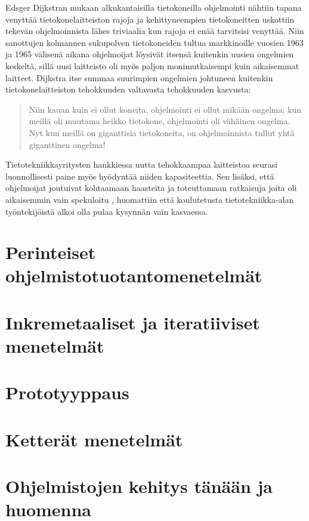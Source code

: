 \documentclass[finnish,12pt]{tktltiki2}
\theoremstyle{definition}
\theoremstyle{remark}
\begin{document}
Edsger Dijkstran mukaan alkukantaisilla tietokoneilla ohjelmointi nähtiin tapana venyttää tietokonelaitteiston rajoja ja kehittyneempien tietokoneitten uskottiin tekevän ohjelmoinnista lähes triviaalia kun rajoja ei enää tarvitsisi venyttää. \cite{Dijkstra:1979:HP:1241515.1241525} Niin sanottujen kolmannen sukupolven tietokoneiden tultua markkinoille vuosien 1963 ja 1965 välisenä aikana ohjelmoijat löysivät itsensä kuitenkin uusien ongelmien keskeltä, sillä uusi laitteisto oli myös paljon monimutkaisempi kuin aikaisemmat laitteet. Dijkstra itse summaa suurimpien ongelmien johtuneen kuitenkin tietokonelaitteiston tehokkuuden valtavasta tehokkuuden kasvusta: \begin{quote}
Niin kauan kuin ei ollut koneita, ohjelmointi ei ollut mikään ongelma; kun meillä oli muutama heikko tietokone, ohjelmointi oli vähäinen ongelma. Nyt kun meillä on giganttisia tietokoneita, on ohjelmoinnista tullut yhtä giganttinen ongelma! \cite{Dijkstra:1979:HP:1241515.1241525}
\end{quote} Tietotekniikkayritysten hankkiessa uutta tehokkaampaa laitteistoa seurasi luonnollisesti paine myös hyödyntää niiden kapasiteettia. Sen lisäksi, että ohjelmoijat joutuivat kohtaamaan haasteita ja toteuttamaan ratkaisuja joita oli aikaisemmin vain spekuloitu \cite{Dijkstra:1979:HP:1241515.1241525}, huomattiin että koulutetusta tietotekniikka-alan työntekijöistä alkoi olla pulaa kysynnän vain kasvaessa. \cite{DBLP:reference/se/Grier10}



\section{Perinteiset ohjelmistotuotantomenetelmät}
\section{Inkremetaaliset ja iteratiiviset menetelmät}
\section{Prototyyppaus}
\section{Ketterät menetelmät}
\section{Ohjelmistojen kehitys tänään ja huomenna}

%
%
% 
%







% 
\end{document}
